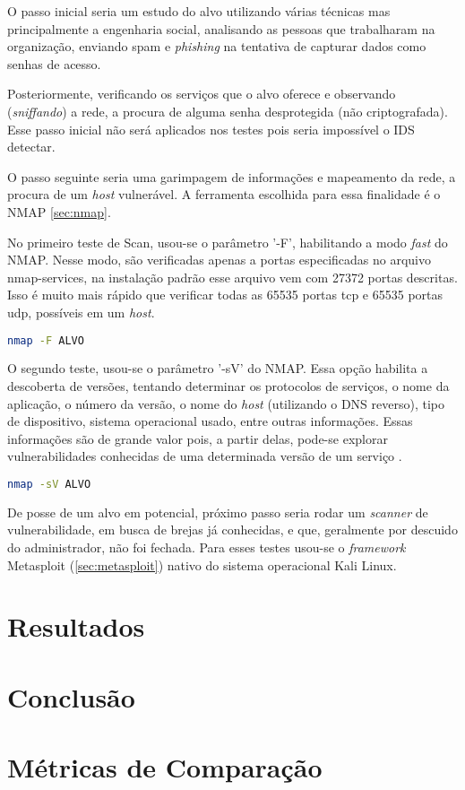 O passo inicial seria um estudo do alvo utilizando várias técnicas mas principalmente a engenharia social, analisando as pessoas que trabalharam na organização, enviando spam e \textit{phishing} na tentativa de capturar dados como senhas de acesso. 

Posteriormente, verificando os serviços que o alvo oferece e observando (\textit{sniffando}) a rede, a procura de alguma senha desprotegida (não criptografada). Esse passo inicial não será aplicados nos testes pois seria impossível o IDS detectar.

O passo seguinte seria uma garimpagem de informações e mapeamento da rede, a procura de um \textit{host} vulnerável. A ferramenta escolhida para essa finalidade é o NMAP \autoref{sec:nmap}. 

No primeiro teste de Scan, usou-se o parâmetro '-F', habilitando a modo \textit{fast} do NMAP. Nesse modo, são verificadas apenas a portas especificadas no arquivo nmap-services, na instalação padrão esse arquivo vem com 27372 portas descritas. Isso é muito mais rápido que verificar todas as 65535 portas tcp e 65535 portas udp, possíveis em um \textit{host}.

\begin{lstlisting}[language=bash, frame=single]
    nmap -F ALVO
\end{lstlisting}

O segundo teste, usou-se o parâmetro '-sV' do NMAP. Essa opção habilita a descoberta de versões, tentando determinar os protocolos de serviços, o nome da aplicação, o número da versão, o nome do \textit{host} (utilizando o DNS reverso), tipo de dispositivo, sistema operacional usado, entre outras informações. Essas informações são de grande valor pois, a partir delas, pode-se explorar vulnerabilidades conhecidas de uma determinada versão de um serviço \cite{nmap}.

\begin{lstlisting}[language=bash, frame=single]  
    nmap -sV ALVO
\end{lstlisting}

De posse de um alvo em potencial, próximo passo seria rodar um \textit{scanner} de vulnerabilidade, em busca de brejas já conhecidas, e que, geralmente por descuido do administrador, não foi fechada. Para esses testes usou-se o \textit{framework} Metasploit (\autoref{sec:metasploit}) nativo do sistema operacional Kali Linux.



\section{Resultados} \label{sec:resultados}
\section{Conclusão} \label{sec:conclusão}
\section{Métricas de Comparação}
